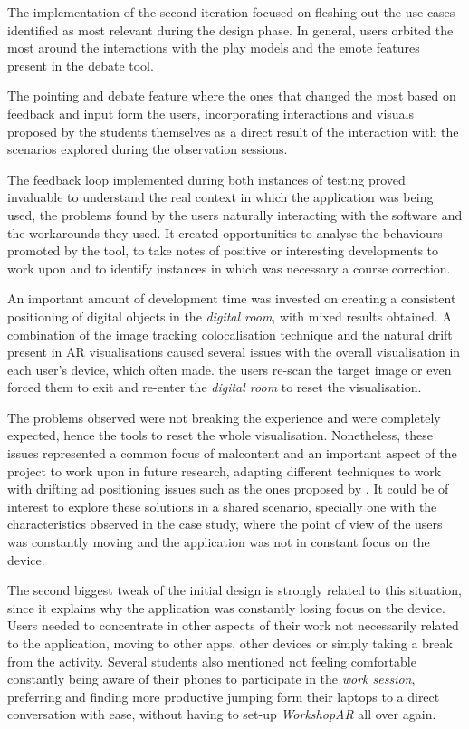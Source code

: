 The implementation of the second iteration focused on fleshing out the use cases identified as most relevant during the design phase. In general, users orbited the most around the
interactions with the play models and the emote features present in the debate tool.

The pointing and debate feature where the ones that changed the most based on feedback and input form the users, incorporating interactions and visuals proposed by the students themselves
as a direct result of the interaction with the scenarios explored during the observation sessions.

The feedback loop implemented during both instances of testing proved invaluable to understand the real context in which the application was being used, the problems found by the users
naturally interacting with the software and the workarounds they used. It created opportunities to analyse the behaviours promoted by the tool, to take notes of positive or interesting
developments to work upon and to identify instances in which was necessary a course correction.

An important amount of development time was invested on creating a consistent positioning of digital objects in the \emph{digital room}, with mixed results obtained. A combination of the
image tracking colocalisation technique and the natural drift present in \ac{AR} visualisations caused several issues with the overall visualisation in each user's device, which often made.
the users re-scan the target image or even forced them to exit and re-enter the \emph{digital room} to reset the visualisation.

The problems observed were not breaking the experience and were completely expected, hence the tools to reset the whole visualisation. Nonetheless, these issues represented a common focus
of malcontent and an important aspect of the project to work upon in future research, adapting different techniques to work with drifting ad positioning issues such as the ones proposed by
\textcite{ran_2020}. It could be of interest to explore these solutions in a shared scenario, specially one with the characteristics observed in the case study, where the point of view of
the users was constantly moving and the application was not in constant focus on the device.

The second biggest tweak of the initial design is strongly related to this situation, since it explains why the application was constantly losing focus on the device. Users needed to
concentrate in other aspects of their work not necessarily related to the application, moving to other apps, other devices or simply taking a break from the activity. Several students
also mentioned not feeling comfortable constantly being aware of their phones to participate in the \emph{work session}, preferring and finding more productive jumping form their laptops
to a direct conversation with ease, without having to set-up \emph{WorkshopAR} all over again.

